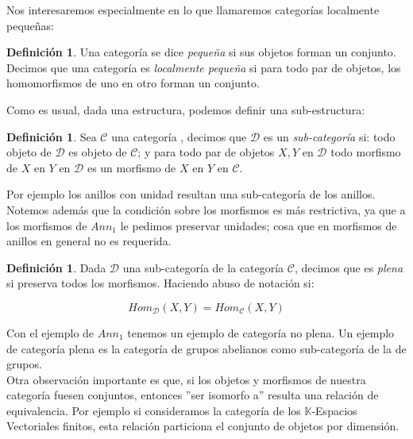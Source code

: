 \documentclass{article}
\theoremstyle{plain}
\theoremstyle{definition}
\newtheorem{definition}[theorem]{Definición}
\theoremstyle{remark}
\begin{document}
Nos interesaremos especialmente en lo que llamaremos categorías localmente pequeñas:

\begin{definition}
    Una categoría se dice \textit{pequeña} si sus objetos forman un conjunto. \\

    Decimos que una categoría es \textit{localmente pequeña} si para todo par de objetos, los homomorfismos de uno en otro forman un conjunto.
\end{definition}

Como es usual, dada una estructura, podemos definir una sub-estructura:

\begin{definition}
    Sea $\mathcal{C}$ una categoría , decimos que $\mathcal{D}$ es un \textit{sub-categoría} si: todo objeto de $\mathcal{D}$ es objeto de $\mathcal{C}$; y para todo par de objetos $X,Y$ en $\mathcal{D}$ todo morfismo de $X$ en $Y$ en $\mathcal{D}$ es un morfismo de $X$ en $Y$ en $\mathcal{C}$. 
\end{definition}

Por ejemplo los anillos con unidad resultan una sub-categoría de los anillos. Notemos además que la condición sobre los morfismos es más restrictiva, ya que a los morfismos de $Ann_1$ le pedimos preservar unidades; cosa que en morfismos de anillos en general no es requerida. \\

\begin{definition}
    Dada $\mathcal{D}$ una sub-categoría de la categoría $\mathcal{C}$, decimos que es \textit{plena} si preserva todos los morfismos. Haciendo abuso de notación si:

    \begin{equation*}
        Hom_{\mathcal{D}}(X,Y) = Hom_{\mathcal{C}}(X,Y) 
    \end{equation*}
\end{definition}

Con el ejemplo de $Ann_1$ tenemos un ejemplo de categoría no plena. Un ejemplo de categoría plena es la categoría de grupos abelianos como sub-categoría de la de grupos. \\

Otra observación importante es que, si los objetos y morfismos de nuestra categoría fuesen conjuntos, entonces ''ser isomorfo a'' resulta una relación de equivalencia. Por ejemplo si consideramos la categoría de los $\mathbb{K}$-Espacios Vectoriales finitos, esta relación particiona el conjunto de objetos por dimensión. \\
\end{document}
